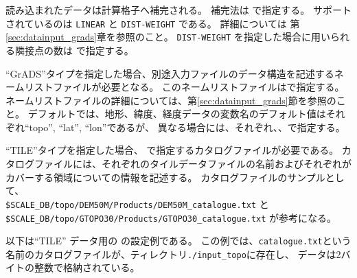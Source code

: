 読み込まれたデータは計算格子へ補完される。
補完法は  で指定する。
サポートされているのは \verb|LINEAR| と \verb|DIST-WEIGHT| である。
詳細については 第\ref{sec:datainput_grads}章を参照のこと。
\verb|DIST-WEIGHT| を指定した場合に用いられる隣接点の数は  で指定する。



``GrADS''タイプを指定した場合、別途入力ファイルのデータ構造を記述するネームリストファイルが必要となる。
このネームリストファイルはで指定する。
ネームリストファイルの詳細については、第\ref{sec:datainput_grads}節を参照のこと。
デフォルトでは、地形、緯度、経度データの変数名のデフォルト値はそれぞれ``topo'', ``lat'', ``lon''であるが、
異なる場合には、それぞれ、、で指定する。


``TILE''タイプを指定した場合、 で指定するカタログファイルが必要である。
カタログファイルには、それぞれのタイルデータファイルの名前およびそれぞれがカバーする領域についての情報を記述する。
カタログファイルのサンプルとして、\\ \verb|$SCALE_DB/topo/DEM50M/Products/DEM50M_catalogue.txt| と\\
\verb|$SCALE_DB/topo/GTOPO30/Products/GTOPO30_catalogue.txt| が参考になる。

以下は``TILE'' データ用の  の設定例である。
この例では、\verb|catalogue.txt|という名前のカタログファイルが、ティレクトリ\verb|./input_topo|に存在し、
データは2バイトの整数で格納されている。

